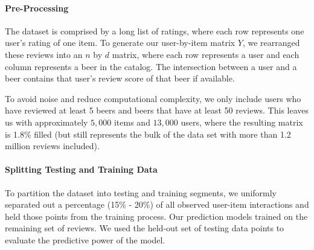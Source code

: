 \documentclass[12pt]{article}
\begin{document}

\paragraph{Pre-Processing}
The dataset is comprised by a long list of ratings, where each row represents one user's rating of one item. To generate our user-by-item matrix $Y$, we rearranged these reviews into an $n$ by $d$ matrix, where each row represents a user and each column represents a beer in the catalog. The intersection between a user and a beer contains that user's review score of that beer if available.

To avoid noise and reduce computational complexity, we only include users who have reviewed at least 5 beers and beers that have at least 50 reviews. This leaves us with approximately $5,000$ items and $13,000$ users, where the resulting matrix is 1.8\% filled (but still represents the bulk of the data set with more than 1.2 million reviews included).





\paragraph{Splitting Testing and Training Data} To partition the dataset into testing and training segments, we uniformly separated out a percentage (15\% - 20\%) of all observed user-item interactions and held those points from the training process. Our prediction models trained on the remaining set of reviews. We used the held-out set of testing data points to evaluate the predictive power of the model.
\end{document}
